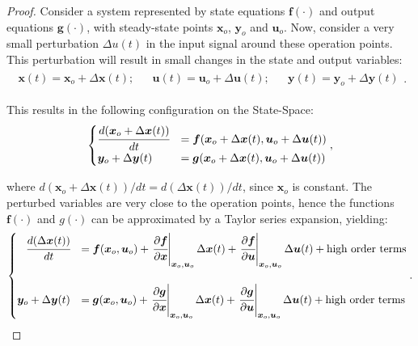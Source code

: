 \documentclass[a4paper,11pt]{book}
\numberwithin{figure}{chapter}
\numberwithin{equation}{chapter}
\numberwithin{table}{chapter}
\theoremstyle{definition}
\begin{document}
\begin{proof}
    Consider a system represented by state equations $\bm{f}(\cdot)$ and output equations $\bm{g}(\cdot)$, with steady-state points $\bm{x}_o$, $\bm{y}_o$ and $\bm{u}_o$. Now, consider a very small perturbation $\Delta u(t)$ in the input signal around these operation points. This perturbation will result in small changes in the state and output variables:
    \begin{align}
    \begin{matrix}
        \bm{x}(t) = \bm{x}_o + \Delta \bm{x}(t); & &
        \bm{u}(t) = \bm{u}_o + \Delta \bm{u}(t); & &
        \bm{y}(t) = \bm{y}_o + \Delta \bm{y}(t)
    \end{matrix}
    .\end{align}
    
    This results in the following configuration on the State-Space:
    \begin{align}
    \begin{cases}
        \cfrac{d(\bm{x}_o + \Delta \bm{x}(t))}{dt} &= \bm{f}(\bm{x}_o + \Delta \bm{x}(t), \bm{u}_o + \Delta \bm{u}(t) ) \\
        \bm{y}_o + \Delta \bm{y}(t) &= \bm{g}(\bm{x}_o + \Delta \bm{x}(t), \bm{u}_o + \Delta \bm{u}(t) ) \\
    \end{cases}
    ,\end{align}
    
    \noindent where $d(\bm{x}_o + \Delta \bm{x}(t)) / dt = d(\Delta \bm{x}(t)) / dt$, since $\bm{x}_o$ is constant. The perturbed variables are very close to the operation points, hence the functions $\bm{f}(\cdot)$ and $g(\cdot)$ can be approximated by a Taylor series expansion, yielding:
    \begin{align}
    \begin{cases}
        \hfill \cfrac{d(\Delta \bm{x}(t))}{dt} &= \bm{f}(\bm{x}_o, \bm{u}_o) + \left. \cfrac{\partial \bm{f}}{\partial \bm{x}}\right\vert_{\bm{x}_o, \bm{u}_o} \Delta \bm{x}(t) + \left. \cfrac{\partial \bm{f}}{\partial \bm{u}}\right\vert_{\bm{x}_o, \bm{u}_o}  \Delta \bm{u}(t) + \text{high order terms} \\ \\
        \bm{y}_o + \Delta \bm{y}(t) &= \bm{g}(\bm{x}_o, \bm{u}_o) + \left. \cfrac{\partial \bm{g}}{\partial \bm{x}}\right\vert_{\bm{x}_o, \bm{u}_o} \Delta \bm{x}(t) + \left. \cfrac{\partial \bm{g}}{\partial \bm{u}}\right\vert_{\bm{x}_o, \bm{u}_o}  \Delta \bm{u}(t) + \text{high order terms} \\
    \end{cases}
    .\end{align}
    

\end{proof}
\end{document}
